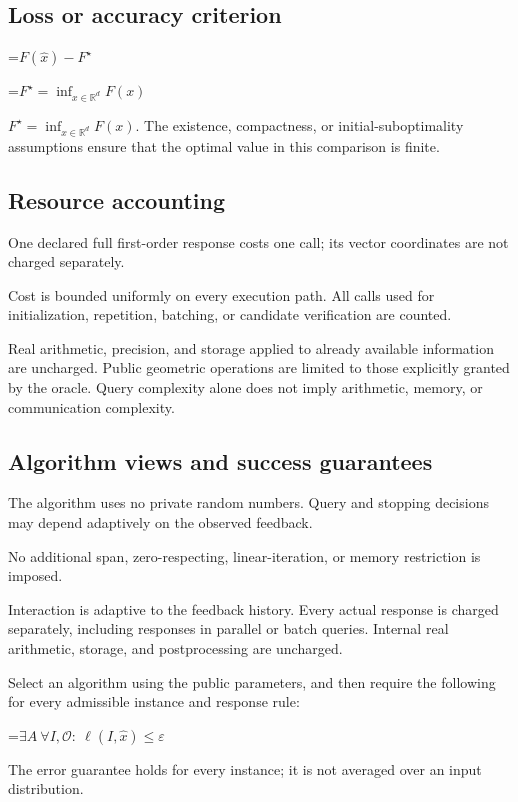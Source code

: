 \documentclass[10pt,a4paper]{article}
\newcommand{\AtlasMath}[1]{\par\begingroup\centering\setbox0=\hbox{$\displaystyle #1$}\ifdim\wd0>1.4\linewidth\typeout{ATLAS WIDE FORMULA: \the\wd0}\fi\ifdim\wd0>\linewidth\resizebox{\linewidth}{!}{\box0}\else\box0\fi\par\endgroup}
\newcommand{\AtlasInlineMath}[1]{\begingroup\setbox0=\hbox{$#1$}\ifdim\wd0>.4\linewidth\endgroup\AtlasMath{#1}\else\endgroup$#1$\fi}
\begin{document}
\subsection{Loss or accuracy criterion}

\AtlasMath{F(\widehat{x})-F^\star}


\AtlasInlineMath{F^\star=\inf_{x\in \mathbb{R}^d}F(x)}. The existence, compactness, or initial-suboptimality assumptions ensure that the optimal value in this comparison is finite.

\subsection{Resource accounting}
One declared full first-order response costs one call; its vector coordinates are not charged separately.

Cost is bounded uniformly on every execution path. All calls used for initialization, repetition, batching, or candidate verification are counted.

Real arithmetic, precision, and storage applied to already available information are uncharged. Public geometric operations are limited to those explicitly granted by the oracle. Query complexity alone does not imply arithmetic, memory, or communication complexity.

\subsection{Algorithm views and success guarantees}
The algorithm uses no private random numbers. Query and stopping decisions may depend adaptively on the observed feedback.

No additional span, zero-respecting, linear-iteration, or memory restriction is imposed.

Interaction is adaptive to the feedback history. Every actual response is charged separately, including responses in parallel or batch queries. Internal real arithmetic, storage, and postprocessing are uncharged.

Select an algorithm using the public parameters, and then require the following for every admissible instance and response rule:


\AtlasMath{\exists A\ \forall I,\mathcal{O}:\ \ell(I,\widehat{x})\le\varepsilon}


The error guarantee holds for every instance; it is not averaged over an input distribution.
\end{document}
